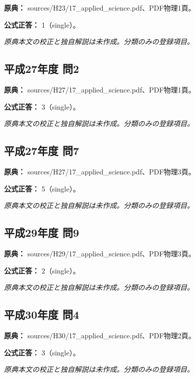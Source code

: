 \noindent\textbf{原典：} sources/H23/17\_applied\_science.pdf、PDF物理1頁。

\textbf{公式正答：} 1（single）。

\par\textit{原典本文の校正と独自解説は未作成。分類のみの登録項目。}

\subsection{平成27年度 問2}
\label{q:h27-reg-applied-02}

\noindent\textbf{原典：} sources/H27/17\_applied\_science.pdf、PDF物理1頁。

\textbf{公式正答：} 3（single）。

\par\textit{原典本文の校正と独自解説は未作成。分類のみの登録項目。}

\subsection{平成27年度 問7}
\label{q:h27-reg-applied-07}

\noindent\textbf{原典：} sources/H27/17\_applied\_science.pdf、PDF物理3頁。

\textbf{公式正答：} 5（single）。

\par\textit{原典本文の校正と独自解説は未作成。分類のみの登録項目。}

\subsection{平成29年度 問9}
\label{q:h29-reg-applied-09}

\noindent\textbf{原典：} sources/H29/17\_applied\_science.pdf、PDF物理3頁。

\textbf{公式正答：} 2（single）。

\par\textit{原典本文の校正と独自解説は未作成。分類のみの登録項目。}

\subsection{平成30年度 問4}
\label{q:h30-reg-applied-04}

\noindent\textbf{原典：} sources/H30/17\_applied\_science.pdf、PDF物理2頁。

\textbf{公式正答：} 3（single）。

\par\textit{原典本文の校正と独自解説は未作成。分類のみの登録項目。}

